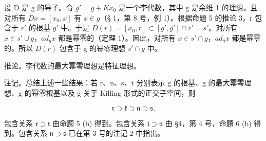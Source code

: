 设 D 是 g 的导子。令 \(g' = g + Kx_0\) 是一个李代数，其中 g 是余维 1 的理想，且对所有 \(Dx = [x_0, x]\) 有 \(x \in g\)（§ 1，第 8 号，例 1）。根据命题 5 的推论 3，r 包含于 \(r'\) 的根基 \(g'\) 中。于是 \(D(r) = [x_0, r] \subset [g', g'] \cap r' = s'\)。对所有 \(x \in s' \cup g\)，\(ad_g x\) 都是幂零的（定理 1）。因此，对所有 \(x \in s' \cap g\)，\(ad_g x\) 都是幂零的。所以 \(D(r)\) 包含于 g 的幂零理想 \(s' \cap g\) 中。

推论。李代数的最大幂零理想是特征理想。

注记。总结上述一些结果：若 r、n、s、t 分别表示 g 的根基、g 的最大幂零理想、g 的幂零根基以及 g 关于 Killing 形式的正交子空间，则

\[
\mathfrak {r} \supset \mathfrak {k} \supset \mathfrak {n} \supset \mathfrak {s}.
\]

包含关系 \(\mathfrak{r} \supset \mathfrak{t}\) 由命题 5 (b) 得到。包含关系 \(\mathfrak{t} \supset \mathfrak{n}\) 由 §4，第 4 号，命题 6 (b) 得到。包含关系 \(\mathfrak{n} \supset \mathfrak{s}\) 已在第 3 号的注记 2 中指出。

